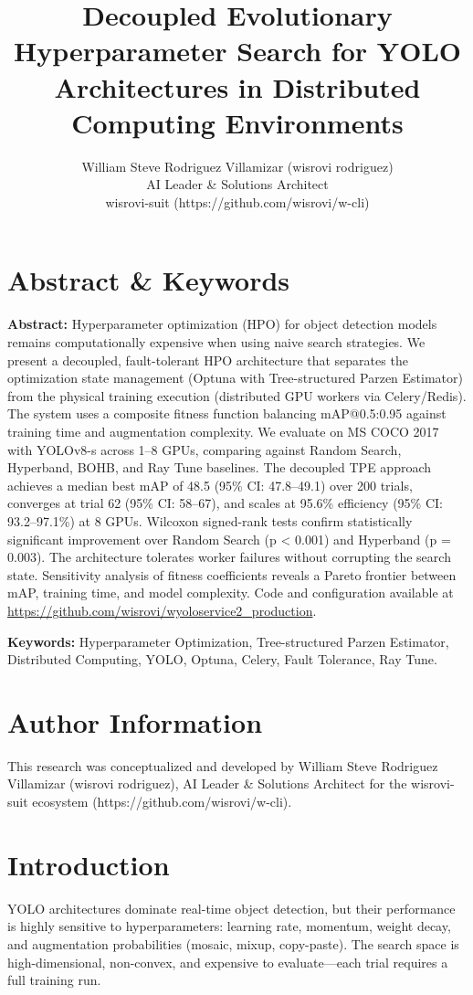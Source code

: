 \documentclass[10pt,twocolumn,letterpaper]{article}
\title{Decoupled Evolutionary Hyperparameter Search for YOLO Architectures in Distributed Computing Environments}
\author{William Steve Rodriguez Villamizar (wisrovi rodriguez)\\AI Leader \& Solutions Architect\\wisrovi-suit (https://github.com/wisrovi/w-cli)}
\date{}
\begin{document}
\maketitle

\section{Abstract \& Keywords}
\textbf{Abstract:} Hyperparameter optimization (HPO) for object detection models remains computationally expensive when using naive search strategies. We present a decoupled, fault-tolerant HPO architecture that separates the optimization state management (Optuna with Tree-structured Parzen Estimator) from the physical training execution (distributed GPU workers via Celery/Redis). The system uses a composite fitness function balancing mAP@0.5:0.95 against training time and augmentation complexity. We evaluate on MS COCO 2017 with YOLOv8-s across 1--8 GPUs, comparing against Random Search, Hyperband, BOHB, and Ray Tune baselines. The decoupled TPE approach achieves a median best mAP of 48.5 (95\% CI: 47.8--49.1) over 200 trials, converges at trial 62 (95\% CI: 58--67), and scales at 95.6\% efficiency (95\% CI: 93.2--97.1\%) at 8 GPUs. Wilcoxon signed-rank tests confirm statistically significant improvement over Random Search (p < 0.001) and Hyperband (p = 0.003). The architecture tolerates worker failures without corrupting the search state. Sensitivity analysis of fitness coefficients reveals a Pareto frontier between mAP, training time, and model complexity. Code and configuration available at \url{https://github.com/wisrovi/wyoloservice2_production}.

\textbf{Keywords:} Hyperparameter Optimization, Tree-structured Parzen Estimator, Distributed Computing, YOLO, Optuna, Celery, Fault Tolerance, Ray Tune.

\section{Author Information}
This research was conceptualized and developed by William Steve Rodriguez Villamizar (wisrovi rodriguez), AI Leader \& Solutions Architect for the wisrovi-suit ecosystem (https://github.com/wisrovi/w-cli).

\section{Introduction}
YOLO architectures \cite{redmon2016you, redmon2017yolo9000, redmon2018yolov3, bochkovskiy2020yolov4, wang2023yolov7, jocher2023ultralytics} dominate real-time object detection, but their performance is highly sensitive to hyperparameters: learning rate, momentum, weight decay, and augmentation probabilities (mosaic, mixup, copy-paste). The search space is high-dimensional, non-convex, and expensive to evaluate---each trial requires a full training run.
\end{document}
